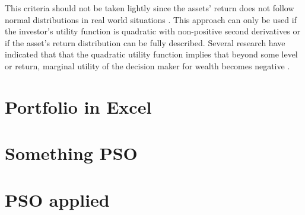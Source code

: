 \documentclass{pdfmx4020}
\begin{document}
    This criteria should not be taken lightly since the assets' return does not follow normal distributions in real world situations \cite{non-dist}. This approach can only be used if the investor's utility function is quadratic with non-positive second derivatives or if the asset's return distribution can be fully described. Several research have indicated that that the quadratic utility function implies that beyond some level or return, marginal utility of the decision maker for wealth becomes negative \cite{crit2,crit3}. 

  





  \section{Portfolio in Excel} %
  \label{sec:portfolio_in_excel}
    

  \section{Something PSO} %
  \label{sec:something_pso}
  

  \section{PSO applied} %
  \label{sec:pso_applied}
  
\end{document}
